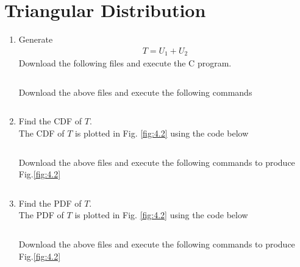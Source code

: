 \documentclass[journal,12pt,twocolumn]{IEEEtran}
\renewcommand\thesection{\arabic{section}}
\begin{document}
\section{Triangular Distribution}
\begin{enumerate}[label=\thesection.\arabic*
,ref=\thesection.\theenumi]
\item Generate
    \begin{align}
        T=U_1+U_2
    \end{align}
    \solution Download the following files and execute the  C program.
\begin{lstlisting}

\end{lstlisting}
Download the above files and execute the following commands
\begin{lstlisting}

\end{lstlisting}

\item Find the CDF of $T$.\\
\solution The CDF of $T$ is plotted in Fig. \ref{fig:4.2} using the code below
\begin{lstlisting}

\end{lstlisting}
Download the above files and execute the following commands to produce Fig.\ref{fig:4.2}
\begin{lstlisting}

\end{lstlisting}

\item Find the PDF of $T$.\\
\solution The PDF of $T$ is plotted in Fig. \ref{fig:4.2} using the code below
\begin{lstlisting}

\end{lstlisting}
Download the above files and execute the following commands to produce Fig.\ref{fig:4.2}
\begin{lstlisting}

\end{lstlisting}


\end{enumerate}
\end{document}
